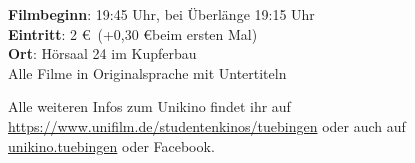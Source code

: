 \textbf{Filmbeginn}: 19:45 Uhr, bei Überlänge 19:15 Uhr\\
\textbf{Eintritt}: 2 \euro ~(+0,30 \euro beim ersten Mal)\\
\textbf{Ort}: Hörsaal 24 im Kupferbau\\
Alle Filme in Originalsprache mit Untertiteln

Alle weiteren Infos zum Unikino findet ihr auf
\url{https://www.unifilm.de/studentenkinos/tuebingen} oder auch auf
\href{https://www.instagram.com/Unikino.Tuebingen}{unikino.tuebingen}
oder Facebook.

